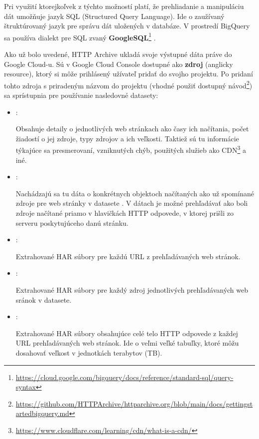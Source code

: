 Pri využití ktorejkoľvek z týchto možností platí, že prehliadanie a manipuláciu dát umožňuje jazyk SQL (Structured Query Language).
Ide o zaužívaný štruktúrovaný jazyk pre správu dát uložených v databáze.
V prostredí BigQuery sa používa dialekt pre SQL zvaný \textbf{GoogleSQL}\footnote{\href{https://cloud.google.com/bigquery/docs/reference/standard-sql/query-syntax}{https://cloud.google.com/bigquery/docs/reference/standard-sql/query-syntax}} \cite{google-bq}.

\pagebreak

Ako už bolo uvedené, HTTP Archive ukladá svoje výstupné dáta práve do Google Cloud-u.
Sú v Google Cloud Console dostupné ako \textbf{zdroj} (anglicky resource), ktorý si môže prihlásený užívateľ pridať do svojho projektu.
Po pridaní tohto zdroja s priradeným názvom  do projektu (vhodné použiť dostupný návod\footnote{\href{https://github.com/HTTPArchive/httparchive.org/blob/main/docs/gettingstarted\_bigquery.md}{https://github.com/HTTPArchive/httparchive.org/blob/main/docs/gettingstarted\textunderscore bigquery.md}}) sa sprístupnia pre používanie nasledovné datasety: \cite{httparchive-repo}

\begin{itemize}
    \item {}:

    Obsahuje detaily o jednotlivých web stránkach ako časy ich načítania, počet žiadostí o jej zdroje, typy zdrojov a ich veľkosti.
    Taktiež sú tu informácie týkajúce sa presmerovaní, vzniknutých chýb, použitých služieb ako CDN\footnote{\href{https://www.cloudflare.com/learning/cdn/what-is-a-cdn/}{https://www.cloudflare.com/learning/cdn/what-is-a-cdn/}} a iné.
    
    \item {}:

    Nachádzajú sa tu dáta o konkrétnych objektoch načítaných ako už spomínané zdroje pre web stránky v datasete .
    V dátach je možné prehľadávať ako boli zdroje načítané priamo v hlavičkách HTTP odpovede, v ktorej prišli zo serveru poskytujúceho danú stránku.
    
    \item {}:

    Extrahované HAR súbory pre každú URL z prehľadávaných web stránok.
    
    \item {}:

    Extrahované HAR súbory pre každý zdroj jednotlivých prehľadávaných web sránok v  datasete.
    
    \item {}:

    Extrahované HAR súbory obsahujúce celé telo HTTP odpovede z každej URL prehľadávaných web stránok.
    Ide o veľmi veľké tabuľky, ktoré môžu dosahovať veľkost v jednotkách terabytov (TB).
\end{itemize}

